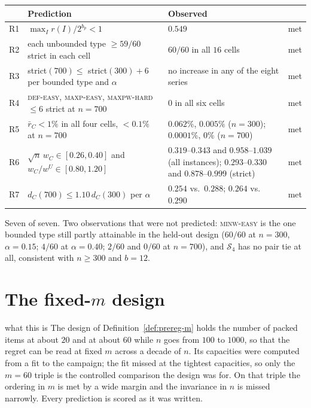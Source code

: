 \documentclass[a4paper,11pt]{article}
\newcommand{\bp}{b_{p}}
\newcommand{\DEF}{\textsc{def}}
\newcommand{\MAXP}{\textsc{maxp}}
\newcommand{\MAXPW}{\textsc{maxpw}}
\newcommand{\MINW}{\textsc{minw}}
\theoremstyle{plain}
\theoremstyle{definition}
\theoremstyle{remark}
\begin{document}
\begin{center}\small
\begin{tabular}{@{}llp{6.6cm}c@{}}
\toprule
& Prediction & Observed & \\
\midrule
R1 & $\max_I r(I)/2^{\bp}<1$ & $0.549$ & met \\
R2 & each unbounded type $\ge59/60$ strict in each cell & $60/60$ in all $16$ cells & met \\
R3 & strict$(700)\le$ strict$(300)+6$ per bounded type and $\alpha$ & no increase in any of the eight series & met \\
R4 & \DEF-\textsc{easy}, \MAXP-\textsc{easy}, \MAXPW-\textsc{hard} $\le6$ strict at $n=700$ & $0$ in all six cells & met \\
R5 & $\bar r_C<1\%$ in all four cells, $<0.1\%$ at $n=700$ & $0.062\%$, $0.005\%$ ($n=300$); $0.0001\%$, $0\%$ ($n=700$) & met \\
R6 & $\sqrt n\,w_C\in[0.26,0.40]$ and $w_C/w^{U}\in[0.80,1.20]$ & $0.319$--$0.343$ and $0.958$--$1.039$ (all instances); $0.293$--$0.330$ and $0.878$--$0.999$ (strict) & met \\
R7 & $d_C(700)\le1.10\,d_C(300)$ per $\alpha$ & $0.254$ vs.\ $0.288$; $0.264$ vs.\ $0.290$ & met \\
\bottomrule
\end{tabular}
\end{center}

Seven of seven. Two observations that were not predicted: \MINW-\textsc{easy} is the one
bounded type still partly attainable in the held-out design ($60/60$ at $n=300$,
$\alpha=0.15$; $4/60$ at $\alpha=0.40$; $2/60$ and $0/60$ at $n=700$), and $\mathcal S_4$
has no pair tie at all, consistent with $n\ge300$ and $b=12$.

\section{The fixed-$m$ design}\label{sec:fixedm-results}

\begin{plain}{what this is}
The design of Definition~\ref{def:prereg-m} holds the number of packed items at about $20$
and at about $60$ while $n$ goes from $100$ to $1000$, so that the regret can be read at
fixed $m$ across a decade of $n$. Its capacities were computed from a fit to the campaign;
the fit missed at the tightest capacities, so only the $m=60$ triple is the controlled
comparison the design was for. On that triple the ordering in $m$ is met by a wide margin
and the invariance in $n$ is missed narrowly. Every prediction is scored as it was written.
\end{plain}
\end{document}
